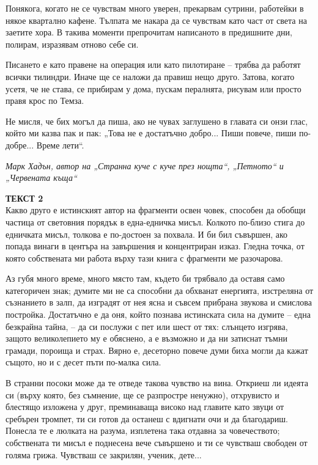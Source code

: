 \documentclass[12pt,a4paper]{article}
\begin{document}
Понякога, когато не се чувствам много уверен, прекарвам сутрини, работейки в някое квартално кафене. Тълпата ме накара да се чувствам като част от света на заетите хора. В такива моменти препрочитам написаното в предишните дни, полирам, изразявам отново себе си.

Писането е като правене на операция или като пилотиране – трябва да работят всички тилиндри. Иначе ще се наложи да правиш нещо друго. Затова, когато усетя, че не става, се прибирам у дома, пускам пералнята, рисувам или просто правя крос по Темза.

Не мисля, че бих могъл да пиша, ако не чувах заглушено в главата си онзи глас, който ми казва пак и пак: „Това не е достатъчно добро... Пиши повече, пиши по-добре... Време лети“.

\vspace{0.2cm}
\hfill \textit{Марк Хадън, автор на „Странна куче с куче през нощта“, „Петното“ и „Червената къща“}

\vspace{0.6cm}

\noindent
\textbf{ТЕКСТ 2} \\
Какво друго е истинският автор на фрагменти освен човек, способен да обобщи частица от световния порядък в една-едничка мисъл. Колкото по-близо стига до едничката мисъл, толкова е по-достоен за похвала. И би бил съвършен, ако попада винаги в центъра на завършения и концентриран изказ. Гледна точка, от която собствената ми работа върху тази книга с фрагменти ме разочарова.

Аз губя много време, много място там, където би трябвало да оставя само категоричен знак; думите ми не са способни да обхванат енергията, изстреляна от съзнанието в залп, да изградят от нея ясна и съвсем прибрана звукова и смислова постройка. Достатъчно е да оня, който познава истинската сила на думите – една безкрайна тайна, – да си послужи с пет или шест от тях: слънцето изгрява, защото великолепието му е обяснено, а е възможно и да ни затиснат тъмни грамади, пороища и страх. Вярно е, десеторно повече думи биха могли да кажат същото, но и с десет пъти по-малка сила.

В странни посоки може да те отведе такова чувство на вина. Откриеш ли идеята си (върху която, без съмнение, ще се разпростре ненужно), отхрувисто и блестящо изложена у друг, преминаваща високо над главите като звуци от сребърен тромпет, ти си готов да останеш с вдигнати очи и да благодариш. Понесла те е люлката на разума, изплетена така отдавна за човечеството; собствената ти мисъл е поднесена вече съвършено и ти се чувстваш свободен от голяма грижа. Чувстваш се закрилян, ученик, дете...
\end{document}
